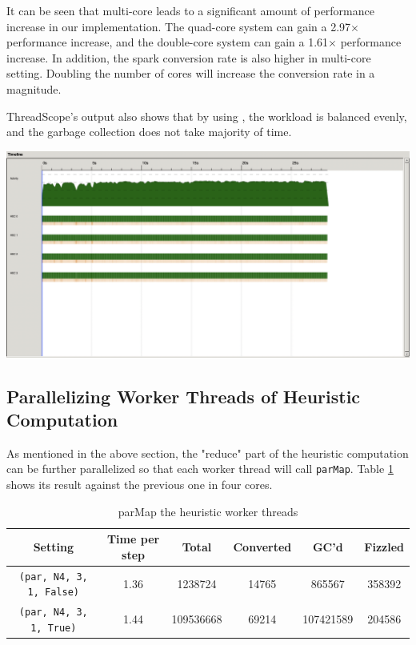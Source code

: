 \documentclass[twoside,11pt]{homework}
\begin{document}
It can be seen that multi-core leads to a significant amount of performance increase in our implementation. The quad-core system can gain a 2.97$\times$ performance increase, and the double-core system can gain a 1.61$\times$ performance increase. In addition, the spark conversion rate is also higher in multi-core setting. Doubling the number of cores will increase the conversion rate in a magnitude.

ThreadScope's output also shows that by using , the workload is balanced evenly, and the garbage collection does not take majority of time.

\includegraphics[scale=0.3]{par_n4_2_1_false.png}

\subsection{Parallelizing Worker Threads of Heuristic Computation}
As mentioned in the above section, the "reduce" part of the heuristic computation can be further parallelized so that each worker thread will call \texttt{parMap}. Table \ref{parMap-heuristic-workers} shows its result against the previous one in four cores.

\begin{table}[h!]
\centering
\begin{tabular}{||c c c c c c||} 
 \hline
 Setting & Time per step & Total & Converted & GC'd & Fizzled \\ [0.5ex] 
 \hline\hline
 \texttt{(par, N4, 3, 1, False)} & 1.36 & 1238724 & 14765 & 865567 & 358392 \\
 \texttt{(par, N4, 3, 1, True)} & 1.44 & 109536668 & 69214 & 107421589 & 204586 \\ [1ex] 
 \hline
\end{tabular}
\caption{parMap the heuristic worker threads}
\label{parMap-heuristic-workers}
\end{table}
\end{document}
